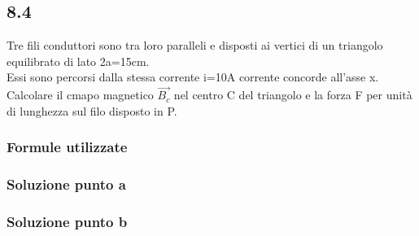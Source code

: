 \documentclass[../../main.tex]{subfiles}
\begin{document}
\subsection*{8.4}
Tre fili conduttori sono tra loro paralleli e disposti ai vertici di un triangolo equilibrato di lato 2a=15cm.
\\Essi sono percorsi dalla stessa corrente i=10A corrente concorde all'asse x.
\\Calcolare il cmapo magnetico $\vec{B_c}$ nel centro C del triangolo e la forza F per unità di lunghezza sul filo disposto in P.
\subsubsection*{Formule utilizzate}
\subsubsection*{Soluzione punto a}
\subsubsection*{Soluzione punto b}
\newpage
\end{document}
